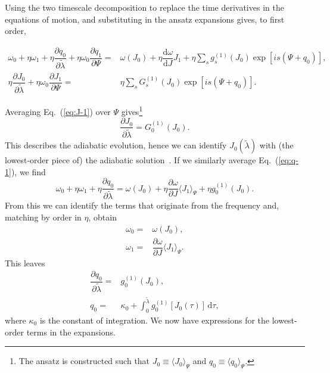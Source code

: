 \documentclass[aps,prd,amsfonts,amssymb,amsmath,nofootinbib,showpacs,superscriptaddress,twocolumn,floatfix]{revtex4-1}
\newcommand{\eqnref}[1]{Eq.~(\ref{eq:#1})}
\newcommand{\dd}{\ensuremath{\mathrm{d}}}
\newcommand{\diff}[2]{\ensuremath{\dfrac{\dd {#1}}{\dd {#2}}}}
\newcommand{\partialdiff}[2]{\ensuremath{\dfrac{\partial {#1}}{\partial {#2}}}}
\newcommand{\intd}[4]{\ensuremath{\int_{#1}^{#2}{#3}\,\dd{#4}}}
\begin{document}
Using the two timescale decomposition to replace the time derivatives in the equations of motion, and substituting in the ansatz expansions gives, to first order,
\begin{widetext}
\begin{subequations}
\begin{align}
\label{eq:q-1}
\omega_0 + \eta\omega_1 + \eta\partialdiff{q_0}{\widetilde{\lambda}} + \eta\omega_0\partialdiff{q_1}{\Psi} = {} & \omega(J_0) + \eta\diff{\omega}{J}J_1 + \eta \sum_s g_s^{(1)}(J_0)\exp\left[is(\Psi + q_0)\right], \\
\eta\partialdiff{J_0}{\widetilde{\lambda}} + \eta\omega_0\partialdiff{J_1}{\Psi} = {} & \eta \sum_s G_s^{(1)}(J_0)\exp\left[is(\Psi + q_0)\right].
\label{eq:J-1}
\end{align}
\end{subequations}
\end{widetext}
Averaging \eqnref{J-1} over $\Psi$ gives\footnote{The ansatz is constructed such that $J_0 \equiv \langle J_0\rangle_\Psi$ and $q_0 \equiv \langle q_0\rangle_\Psi$.}
\begin{equation}
\partialdiff{J_0}{\widetilde{\lambda}} = G_0^{(1)}(J_0).
\label{eq:J-ad}
\end{equation}
This describes the adiabatic evolution, hence we can identify $J_0\left(\widetilde{\lambda}\right)$ with (the lowest-order piece of) the adiabatic solution~\cite{Hinderer2008}. If we similarly average \eqnref{q-1}, we find
\begin{equation}
\omega_0 + \eta\omega_1 +\eta\partialdiff{q_0}{\widetilde{\lambda}} = \omega(J_0) + \eta\partialdiff{\omega}{J}\langle J_1\rangle_\Psi + \eta g_0^{(1)}(J_0).
\end{equation}
From this we can identify the terms that originate from the frequency and, matching by order in $\eta$, obtain
\begin{subequations}
\begin{align}
\omega_0 = {} & \omega(J_0), \\
\omega_1 = {} & \partialdiff{\omega}{J}\langle J_1\rangle_\Psi.
\end{align}
\end{subequations}
This leaves
\begin{align}
\partialdiff{q_0}{\widetilde{\lambda}} = {} & g_0^{(1)}(J_0), \\
q_0 = {} & \kappa_0 + \intd{0}{\tilde{\lambda}}{g_0^{(1)}[J_0(\tau)]}{\tau},
\label{eq:q-0-sol}
\end{align}
where $\kappa_0$ is the constant of integration. We now have expressions for the lowest-order terms in the expansions.
\end{document}
